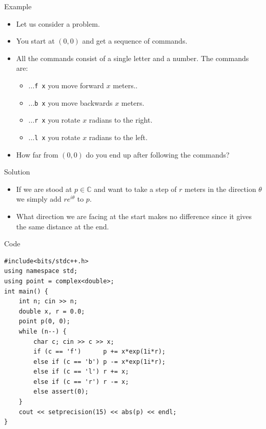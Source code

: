 \documentclass{beamer}
\begin{document}
\begin{frame}[plain]{Example}
	\begin{itemize}
        \item Let us consider a problem.
        \item You start at $(0, 0)$ and get a sequence of commands.
        \item All the commands consist of a single letter and a number. The commands are:
		\begin{itemize}
			\item ...\texttt{f x} you move forward $x$ meters..
			\item ...\texttt{b x} you move backwards $x$ meters.
			\item ...\texttt{r x} you rotate $x$ radians to the right.
			\item ...\texttt{l x} you rotate $x$ radians to the left.
        \end{itemize}
        \item How far from $(0, 0)$ do you end up after following the commands?
    \end{itemize}
\end{frame}

\begin{frame}[plain]{Solution}
	\begin{itemize}
        \item If we are stood at $p \in \mathbb{C}$ and want to take a step of $r$ meters in the direction $\theta$ we simply add $re^{i\theta}$ to $p$.
        \item What direction we are facing at the start makes no difference since it gives the same distance at the end.
    \end{itemize}
\end{frame}

\begin{frame}{Code}
\small
    \begin{verbatim}
#include<bits/stdc++.h>
using namespace std;
using point = complex<double>;
int main() {
    int n; cin >> n;
    double x, r = 0.0;
    point p(0, 0);
    while (n--) {
        char c; cin >> c >> x;
        if (c == 'f')      p += x*exp(1i*r);
        else if (c == 'b') p -= x*exp(1i*r);
        else if (c == 'l') r += x;
        else if (c == 'r') r -= x;
        else assert(0);
	}
    cout << setprecision(15) << abs(p) << endl;
}
    \end{verbatim}
\end{frame}
\end{document}
